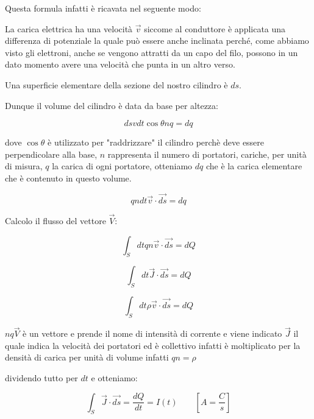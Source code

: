 Questa formula infatti è ricavata nel seguente modo:

La carica elettrica ha una velocità $\vec v$ siccome al conduttore è applicata una differenza di potenziale la quale può essere anche inclinata perché, come abbiamo visto gli elettroni, anche se vengono attratti da un capo del filo, possono in un dato momento avere una velocità che punta in un altro verso.

Una superficie elementare della sezione del nostro cilindro è $ds$.

Dunque il volume del cilindro è data da base per altezza:

\begin{equation*}
    ds v dt \cos\theta n q = dq
\end{equation*}

dove $\cos\theta$ è utilizzato per "raddrizzare" il cilindro perchè deve essere perpendicolare alla base, $n$ rappresenta il numero di portatori, cariche, per unità di misura, $q$ la carica di ogni portatore, otteniamo $dq$ che è la carica elementare che è contenuto in questo volume.

\begin{equation*}
    q n dt \Vec{v}\cdot \Vec{ds}  = dq
\end{equation*}

Calcolo il flusso del vettore $\Vec{V}$:

\begin{equation*}
    \int_S dt qn \Vec{v}\cdot \Vec{ds}  = dQ
\end{equation*}

\begin{equation*}
    \int_S dt \Vec{J}\cdot \Vec{ds}  = dQ
\end{equation*}

\begin{equation*}
    \int_S dt \rho\Vec{v}\cdot \Vec{ds}  = dQ
\end{equation*}

$nq\Vec{V}$ è un vettore e prende il nome di intensità di corrente e viene indicato $\Vec{J}$ il quale indica la velocità dei portatori ed è collettivo infatti è moltiplicato per la densità di carica per unità di volume infatti $qn = \rho$


dividendo tutto per $dt$ e otteniamo:

\begin{equation}
    \int_S \Vec{J}\cdot \Vec{ds}  = \frac{dQ}{dt} = I(t)\qquad[A = \frac{C}{s}]
\end{equation}

